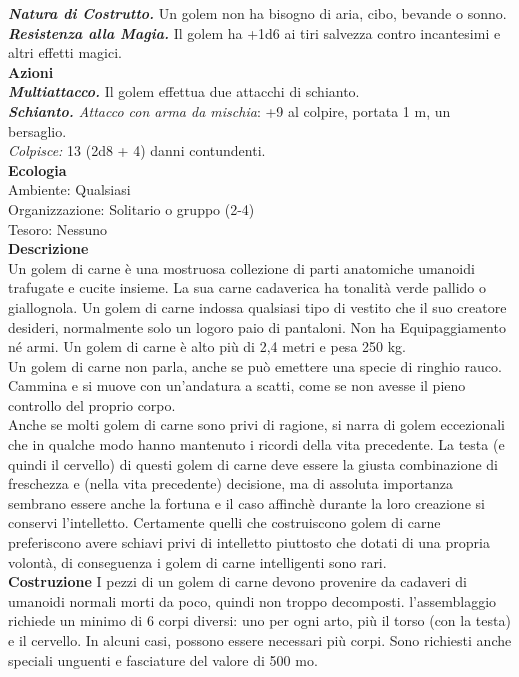 \begin{multicols}{2}
\emph{\textbf{Natura di Costrutto.}} Un golem non ha bisogno di aria, cibo, bevande o sonno.\\
\emph{\textbf{Resistenza alla Magia.}} Il golem ha +1d6 ai tiri salvezza contro incantesimi e altri effetti magici.\\
\smallskip\textbf{Azioni}\\
\emph{\textbf{Multiattacco.}} Il golem effettua due attacchi di schianto.\\
\emph{\textbf{Schianto.} Attacco con arma da mischia}: +9 al colpire, portata 1 m, un bersaglio.\\
\emph{Colpisce:} 13 (2d8 + 4) danni contundenti.\\
\textbf{Ecologia}\\
Ambiente: Qualsiasi\\
Organizzazione: Solitario o gruppo (2-4)\\
Tesoro: Nessuno\\
\textbf{Descrizione}\\
Un golem di carne è una mostruosa collezione di parti anatomiche umanoidi trafugate e cucite insieme. La sua carne cadaverica ha tonalità verde pallido o giallognola. Un golem di carne indossa qualsiasi tipo di vestito che il suo creatore desideri, normalmente solo un logoro paio di pantaloni. Non ha Equipaggiamento né armi. Un golem di carne è alto più di 2,4 metri e pesa 250 kg.\\

Un golem di carne non parla, anche se può emettere una specie di ringhio rauco. Cammina e si muove con un’andatura a scatti, come se non avesse il pieno controllo del proprio corpo.\\

Anche se molti golem di carne sono privi di ragione, si narra di golem eccezionali che in qualche modo hanno mantenuto i ricordi della vita precedente. La testa (e quindi il cervello) di questi golem di carne deve essere la giusta combinazione di freschezza e (nella vita precedente) decisione, ma di assoluta importanza sembrano essere anche la fortuna e il caso affinchè durante la loro creazione si conservi l'intelletto. Certamente quelli che costruiscono golem di carne preferiscono avere schiavi privi di intelletto piuttosto che dotati di una propria volontà, di conseguenza i golem di carne intelligenti sono rari.\\

\textbf{Costruzione}
I pezzi di un golem di carne devono provenire da cadaveri di umanoidi normali morti da poco, quindi non troppo decomposti. l'assemblaggio richiede un minimo di 6 corpi diversi: uno per ogni arto, più il torso (con la testa) e il cervello. In alcuni casi, possono essere necessari più corpi. Sono richiesti anche speciali unguenti e fasciature del valore di 500 mo.\\


\end{multicols}
